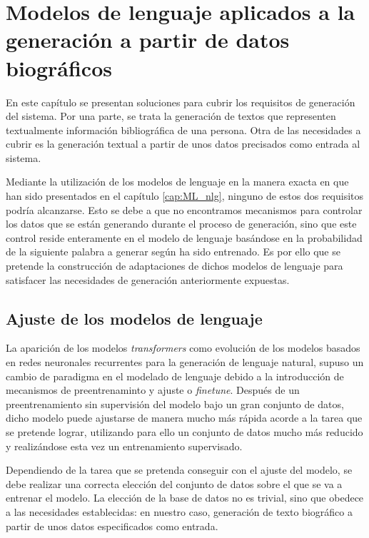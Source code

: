 \chapter{Modelos de lenguaje aplicados a la generación a partir de datos biográficos}
\label{cap:ML_biografica}

En este capítulo se presentan soluciones para cubrir los requisitos de generación del sistema. 
Por una parte, se trata la generación de textos que representen textualmente información bibliográfica de una persona.  
Otra de las necesidades a cubrir es la generación textual a partir de unos datos precisados como entrada al sistema. 

Mediante la utilización de los modelos de lenguaje en la manera exacta en que han sido presentados en el capítulo \ref{cap:ML_nlg}, ninguno de estos dos requisitos podría alcanzarse. Esto se debe a que no encontramos mecanismos para controlar los datos que se están generando durante el proceso de generación, sino que este control reside enteramente en el modelo de lenguaje basándose en la probabilidad de la siguiente palabra a generar según ha sido entrenado. 
Es por ello que se pretende la construcción de adaptaciones de dichos modelos de lenguaje para satisfacer las necesidades de generación anteriormente expuestas.


\section{Ajuste de los modelos de lenguaje}
La aparición de los modelos \textit{transformers} como evolución de los modelos basados en redes neuronales recurrentes para la generación de lenguaje natural, supuso un cambio de paradigma en el modelado de lenguaje debido a la introducción de mecanismos de preentrenaminto y ajuste o \textit{finetune}. Después de un preentrenamiento sin supervisión del modelo bajo un gran conjunto de datos, dicho modelo puede ajustarse de manera mucho más rápida acorde a la tarea que se pretende lograr, utilizando para ello un conjunto de datos mucho más reducido  y realizándose esta vez un entrenamiento supervisado. 

Dependiendo de la tarea que se pretenda conseguir con el ajuste del modelo, se debe realizar una correcta elección del conjunto de datos sobre el que se va a entrenar el modelo. La elección de la base de datos no es trivial, sino que obedece a las necesidades establecidas: en nuestro caso, generación de texto biográfico a partir de unos datos especificados como entrada. 

